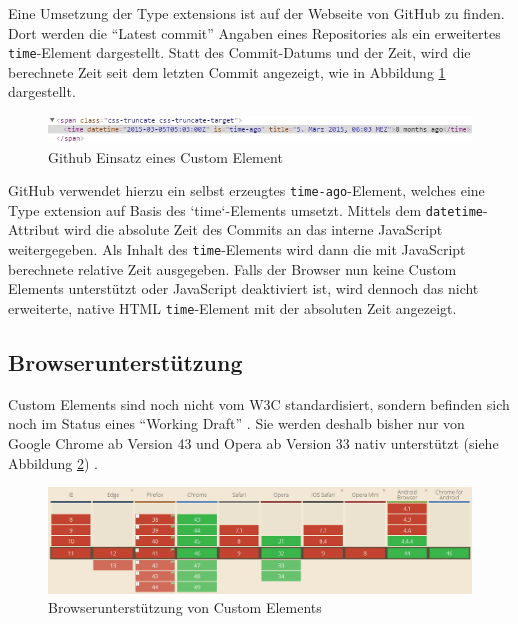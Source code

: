 Eine Umsetzung der Type extensions ist auf der Webseite von GitHub zu finden. Dort werden die ``Latest commit'' Angaben eines Repositories als ein erweitertes \texttt{time}-Element dargestellt. Statt des Commit-Datums und der Zeit, wird die berechnete Zeit seit dem letzten Commit angezeigt, wie in Abbildung \ref{fig:ghece} dargestellt.

\begin{figure}[htbp]
 \centering
 \includegraphics[width=\linewidth]{kapitel2/bilder/2-custom-elements-github-time-element}
 \caption{Github Einsatz eines Custom Element}
 \label{fig:ghece}
\end{figure}

GitHub verwendet hierzu ein selbst erzeugtes \texttt{time-ago}-Element, welches eine Type extension auf Basis des `time`-Elements umsetzt. Mittels dem \texttt{datetime}-Attribut wird die absolute Zeit des Commits an das interne JavaScript weitergegeben. Als Inhalt des \texttt{time}-Elements wird dann die mit JavaScript berechnete relative Zeit ausgegeben. Falls der Browser nun keine Custom Elements unterstützt oder JavaScript deaktiviert ist, wird dennoch das nicht erweiterte, native HTML \texttt{time}-Element mit der absoluten Zeit angezeigt.


\subsection{Browserunterstützung}\label{custom-elements-browserunterstuetzung}

Custom Elements sind noch nicht vom \ac{W3C} standardisiert, sondern befinden sich noch im Status eines ``Working Draft'' \cite{citeulike:13845061}. Sie werden deshalb bisher nur von Google Chrome ab Version 43 und Opera ab Version 33 nativ unterstützt (siehe Abbildung \ref{fig:buce}) \cite{citeulike:13844983}.

\begin{figure}[htbp]
 \centering
 \includegraphics[width=\linewidth]{kapitel2/bilder/2-custom-elements-browserunterstuetzung}
 \caption{Browserunterstützung von Custom Elements}
 \label{fig:buce}
\end{figure}
